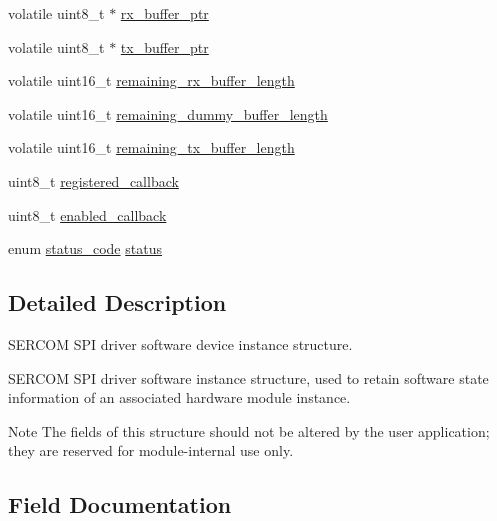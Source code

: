 \begin{DoxyCompactItemize}
\item 
volatile uint8\+\_\+t $\ast$ \mbox{\hyperlink{structspi__module_a20cb7f37889a2de5bcd383a2257905f4}{rx\+\_\+buffer\+\_\+ptr}}
\item 
volatile uint8\+\_\+t $\ast$ \mbox{\hyperlink{structspi__module_ad4f5e977169e703291bab5e3483ff5dd}{tx\+\_\+buffer\+\_\+ptr}}
\item 
volatile uint16\+\_\+t \mbox{\hyperlink{structspi__module_adbc4f86e8d157a19a354c981e1486865}{remaining\+\_\+rx\+\_\+buffer\+\_\+length}}
\item 
volatile uint16\+\_\+t \mbox{\hyperlink{structspi__module_a62c8fcf3ca37424b59c093dd9f56af3b}{remaining\+\_\+dummy\+\_\+buffer\+\_\+length}}
\item 
volatile uint16\+\_\+t \mbox{\hyperlink{structspi__module_a8031a02be57635012242eb4c9fb21934}{remaining\+\_\+tx\+\_\+buffer\+\_\+length}}
\item 
uint8\+\_\+t \mbox{\hyperlink{structspi__module_a635e5d3373f317370711cc10ec77e0f9}{registered\+\_\+callback}}
\item 
uint8\+\_\+t \mbox{\hyperlink{structspi__module_a3bde421512cd5c809ecee069b5914a80}{enabled\+\_\+callback}}
\item 
enum \mbox{\hyperlink{group__group__sam0__utils__status__codes_ga751c892e5a46b8e7d282085a5a5bf151}{status\+\_\+code}} \mbox{\hyperlink{structspi__module_a30c0453c8af1896546c1ab0142be3181}{status}}
\end{DoxyCompactItemize}


\subsection{Detailed Description}
S\+E\+R\+C\+OM S\+PI driver software device instance structure. 

S\+E\+R\+C\+OM S\+PI driver software instance structure, used to retain software state information of an associated hardware module instance.

\begin{DoxyNote}{Note}
The fields of this structure should not be altered by the user application; they are reserved for module-\/internal use only. 
\end{DoxyNote}


\subsection{Field Documentation}
\mbox{\label{structspi__module_a575b1df3b35bc459cf4165cc2af8f692}} 
